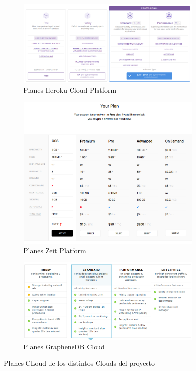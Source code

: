 \begin{figure}\centering[hbtp]
\begin{subfigure}{.6\textwidth}
    \includegraphics[width=\linewidth]{figuras/heroku-plan.png}
    \caption{Planes Heroku Cloud Platform}
    \label{fig::PlanesHerokuCloudPlatform}
\end{subfigure}

\begin{subfigure}{.6\textwidth}
    \includegraphics[width=\linewidth]{figuras/zeit-plan.png}
    \caption{Planes Zeit Platform}
    \label{fig::PlanesZeitPlatform}
\end{subfigure}

\begin{subfigure}{.6\textwidth}
    \includegraphics[width=\linewidth]{figuras/graphenedb-plan.png}
    \caption{Planes GrapheneDB Cloud} 
    \label{fig::PlanesGrapheneDBCloud}
\end{subfigure}
\caption{Planes CLoud de los distintos Clouds del proyecto}
\label{fig::costes}
\end{figure}


